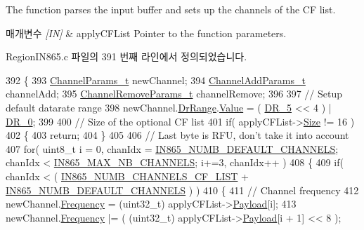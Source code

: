 The function parses the input buffer and sets up the channels of the CF list. 


\begin{DoxyParams}{매개변수}
{\em \mbox{[}\+I\+N\mbox{]}} & apply\+C\+F\+List Pointer to the function parameters. \\
\hline
\end{DoxyParams}


Region\+I\+N865.\+c 파일의 391 번째 라인에서 정의되었습니다.


\begin{DoxyCode}
392 \{
393     \mbox{\hyperlink{structs_channel_params}{ChannelParams\_t}} newChannel;
394     \mbox{\hyperlink{structs_channel_add_params}{ChannelAddParams\_t}} channelAdd;
395     \mbox{\hyperlink{structs_channel_remove_params}{ChannelRemoveParams\_t}} channelRemove;
396 
397     \textcolor{comment}{// Setup default datarate range}
398     newChannel.\mbox{\hyperlink{structs_channel_params_ad4d9b041ea740886a05fa8a1d06997a2}{DrRange}}.\mbox{\hyperlink{unionu_dr_range_ae1e3e8696366e3256e397bbdc4e34775}{Value}} = ( \mbox{\hyperlink{group___r_e_g_i_o_n_ga872e12c82020c02a7f70a1c6ed1375df}{DR\_5}} << 4 ) | \mbox{\hyperlink{group___r_e_g_i_o_n_ga6c4ef966b4f3d5eb7597b087f2b97095}{DR\_0}};
399 
400     \textcolor{comment}{// Size of the optional CF list}
401     \textcolor{keywordflow}{if}( applyCFList->\mbox{\hyperlink{structs_apply_c_f_list_params_ace31de7598e85e87624c4e7d8e5d112c}{Size}} != 16 )
402     \{
403         \textcolor{keywordflow}{return};
404     \}
405 
406     \textcolor{comment}{// Last byte is RFU, don't take it into account}
407     \textcolor{keywordflow}{for}( uint8\_t i = 0, chanIdx = \mbox{\hyperlink{group___r_e_g_i_o_n_i_n865_ga166b325d6a142fe02d403487b708fcbb}{IN865\_NUMB\_DEFAULT\_CHANNELS}}; chanIdx < 
      \mbox{\hyperlink{group___r_e_g_i_o_n_i_n865_ga6fbcf463cb8df05984d576d96383651d}{IN865\_MAX\_NB\_CHANNELS}}; i+=3, chanIdx++ )
408     \{
409         \textcolor{keywordflow}{if}( chanIdx < ( \mbox{\hyperlink{group___r_e_g_i_o_n_i_n865_gacf065f42ef7f7e9c2815559116faf20a}{IN865\_NUMB\_CHANNELS\_CF\_LIST}} + 
      \mbox{\hyperlink{group___r_e_g_i_o_n_i_n865_ga166b325d6a142fe02d403487b708fcbb}{IN865\_NUMB\_DEFAULT\_CHANNELS}} ) )
410         \{
411             \textcolor{comment}{// Channel frequency}
412             newChannel.\mbox{\hyperlink{structs_channel_params_ade3d190636488dad9a89b19446b7acf1}{Frequency}} = (uint32\_t) applyCFList->\mbox{\hyperlink{structs_apply_c_f_list_params_a3dfbfe76c8f3bd25765750487b815147}{Payload}}[i];
413             newChannel.\mbox{\hyperlink{structs_channel_params_ade3d190636488dad9a89b19446b7acf1}{Frequency}} |= ( (uint32\_t) applyCFList->\mbox{\hyperlink{structs_apply_c_f_list_params_a3dfbfe76c8f3bd25765750487b815147}{Payload}}[i + 1] << 8 );

\end{DoxyCode}
